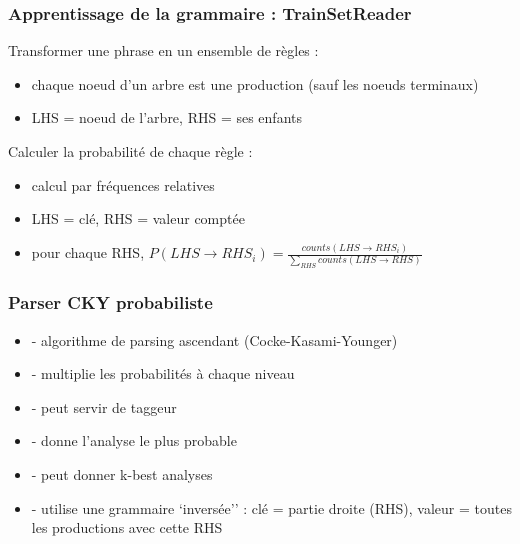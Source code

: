 \documentclass{beamer}
\begin{document}
\begin{frame}
\frametitle{Apprentissage de la grammaire : TrainSetReader}
Transformer une phrase en un ensemble de r\`egles : 
\begin{itemize}
  \item chaque noeud d'un arbre est une production (sauf les noeuds terminaux)
  \item LHS = noeud de l'arbre, RHS = ses enfants
\end{itemize}
\pause
Calculer la probabilit\'e de chaque r\`egle : 
\begin{itemize}
  \item calcul par fr\'equences relatives
  \item LHS = cl\'e, RHS = valeur compt\'ee
  \item pour chaque RHS, $P(LHS \rightarrow RHS_{i}) = \frac{counts(LHS
  \rightarrow RHS_{i})}{\sum_{RHS}counts(LHS \rightarrow RHS)}$
\end{itemize}
\end{frame}

\begin{frame}
\frametitle{Parser CKY probabiliste}
\begin{itemize}
  \item - algorithme de parsing ascendant (Cocke-Kasami-Younger)
  \item - multiplie les probabilit\'es \`a chaque niveau
  \item - peut servir de taggeur
  \item - donne l'analyse le plus probable
  \item - peut donner k-best analyses
  \item - utilise une grammaire `invers\'ee'' : cl\'e = partie droite
  (RHS), valeur = toutes les productions avec cette RHS
\end{itemize}
\end{frame}
\end{document}
